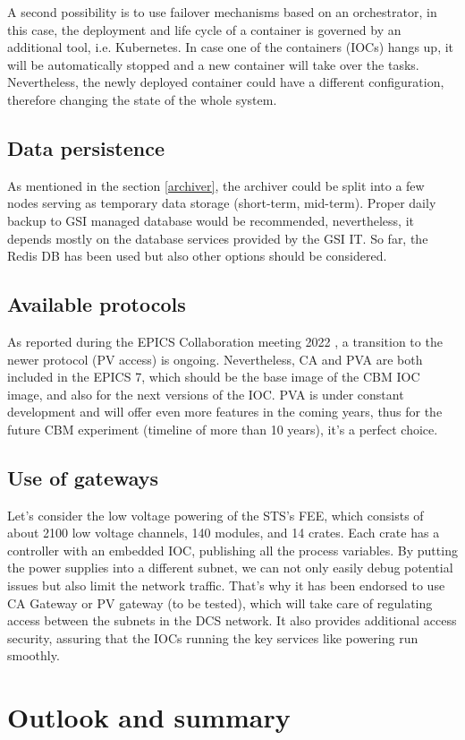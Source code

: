A second possibility is to use failover mechanisms based on an orchestrator, in this case, the deployment and life cycle of a container is governed by an additional tool, i.e. Kubernetes. In case one of the containers (IOCs) hangs up, it will be automatically stopped and a new container will take over the tasks. Nevertheless, the newly deployed container could have a different configuration, therefore changing the state of the whole system. 


\subsection{Data persistence}

As mentioned in the section \ref{archiver}, the archiver could be split into a few nodes serving as temporary data storage (short-term, mid-term). Proper daily backup to GSI managed database would be recommended, nevertheless, it depends mostly on the database services provided by the GSI IT. So far, the Redis DB has been used but also other options should be considered. 

\subsection{Available protocols}
As reported during the EPICS Collaboration meeting 2022 \cite{epics_2022}, a transition to the newer protocol (PV access) is ongoing. Nevertheless, CA and PVA are both included in the EPICS 7, which should be the base image of the CBM IOC image, and also for the next versions of the IOC. PVA is under constant development and will offer even more features in the coming years, thus for the future CBM experiment (timeline of more than 10 years), it's a perfect choice. 

\subsection{Use of gateways}
Let's consider the low voltage powering of the STS's FEE, which consists of about 2100 low voltage channels, 140 modules, and 14 crates. Each crate has a controller with an embedded \gls{IOC}, publishing all the process variables. By putting the power supplies into a different subnet, we can not only easily debug potential issues but also limit the network traffic. That's why it has been endorsed to use CA Gateway \cite{gateway} or PV gateway (to be tested), which will take care of regulating access between the subnets in the DCS network. It also provides additional access security, assuring that the IOCs running the key services like powering run smoothly.

\section{Outlook and summary}
